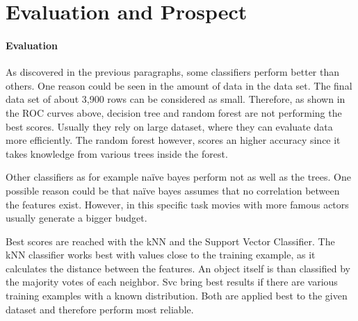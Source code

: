 \section{Evaluation and Prospect}
\paragraph{Evaluation}

\label{cha:prospect}

As discovered in the previous paragraphs, some classifiers perform better than others. One reason could be seen in the amount of data in the data set. The final data set of about 3,900 rows can be considered as small. Therefore, as shown in the ROC curves above, decision tree and random forest are not performing the best scores. Usually they rely on large dataset, where they can evaluate data more efficiently. The random forest however, scores an higher accuracy since it takes knowledge from various trees inside the forest.



Other classifiers as for example na\"{i}ve bayes perform not as well as the trees. One possible reason could be that na\"{i}ve bayes assumes that no correlation between the features exist. However, in this specific task movies with more famous actors usually generate a bigger budget. 

Best scores are reached with the kNN and the Support Vector Classifier. The kNN classifier works best with values close to the training example, as it calculates the distance between the features. An object itself is than classified by the majority votes of each neighbor.
Svc bring best results if there are various training examples with a known distribution. Both are applied best to the given dataset and therefore perform most reliable.








